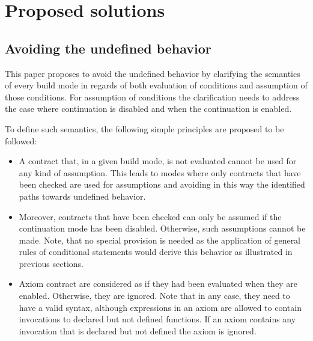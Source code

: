 \section{Proposed solutions}
\label{sec:proposed}

\subsection{Avoiding the undefined behavior}

This paper proposes to avoid the undefined behavior by clarifying the semantics of every
build mode in regards of both evaluation of conditions and assumption of those
conditions. For assumption of conditions the clarification needs to address the
case where continuation is disabled and when the continuation is enabled.

To define such semantics, the following simple principles are proposed to be followed:

\begin{itemize}

\item A contract that, in a given build mode, is not evaluated cannot be used
for any kind of assumption. This leads to modes where only contracts that have
been checked are used for assumptions and avoiding in this way the identified
paths towards undefined behavior.

\item Moreover, contracts that have been checked can only be assumed if the
continuation mode has been disabled. Otherwise, such assumptions cannot be made.
Note, that no special provision is needed as the application of general rules
of conditional statements would derive this behavior as illustrated in previous
sections.

\item Axiom contract are considered as if they had been evaluated when they are
	enabled. Otherwise, they are ignored.  Note that in any case, they need
		to have a valid syntax, although expressions in an axiom are
		allowed to contain invocations to declared but not defined
		functions. If an axiom contains any invocation that is declared
		but not defined the axiom is ignored.

\end{itemize}

